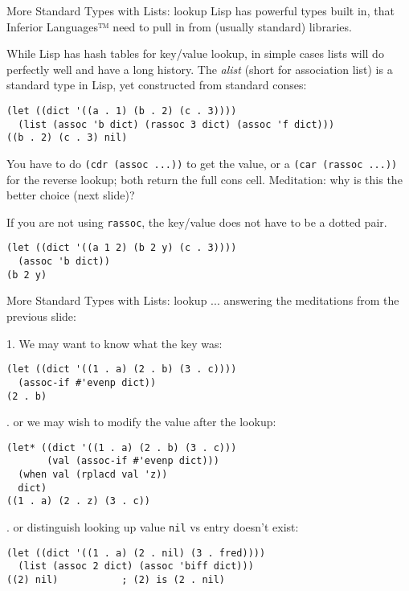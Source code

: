 \documentclass[presentation]{beamer}
\begin{document}
\begin{frame}[fragile]{More Standard Types with Lists: lookup}
  Lisp has powerful types built in, that Inferior Languages™ need to pull in from (usually standard) libraries.

  \medskip
While Lisp has hash tables for key/value lookup, in simple cases lists will do perfectly well and have a long history.  The \emph{alist} (short for association list) is a standard type in Lisp, yet constructed from standard conses:
\begin{verbatim}
(let ((dict '((a . 1) (b . 2) (c . 3))))
  (list (assoc 'b dict) (rassoc 3 dict) (assoc 'f dict)))
((b . 2) (c . 3) nil)
\end{verbatim}
You have to do \texttt{(cdr (assoc ...))} to get the value, or a \texttt{(car (rassoc ...))} for the reverse lookup; both return the full cons cell.  Meditation: why is this the better choice (next slide)?

If you are not using \texttt{rassoc}, the key/value does not have to be a dotted pair.

\begin{verbatim}
(let ((dict '((a 1 2) (b 2 y) (c . 3))))
  (assoc 'b dict))
(b 2 y)
\end{verbatim}
\end{frame}

\begin{frame}[fragile]{More Standard Types with Lists: lookup}
  ... answering the meditations from the previous slide:

1. We may want to know what the key was:
\begin{verbatim}
(let ((dict '((1 . a) (2 . b) (3 . c))))
  (assoc-if #'evenp dict))
(2 . b)
\end{verbatim}
. or we may wish to modify the value after the lookup:
\begin{verbatim}
(let* ((dict '((1 . a) (2 . b) (3 . c)))
       (val (assoc-if #'evenp dict)))
  (when val (rplacd val 'z))
  dict)
((1 . a) (2 . z) (3 . c))
\end{verbatim}
. or distinguish looking up value \texttt{nil} vs entry doesn't exist:
\begin{verbatim}
(let ((dict '((1 . a) (2 . nil) (3 . fred))))
  (list (assoc 2 dict) (assoc 'biff dict)))
((2) nil)           ; (2) is (2 . nil)
\end{verbatim}
\end{frame}
\end{document}
